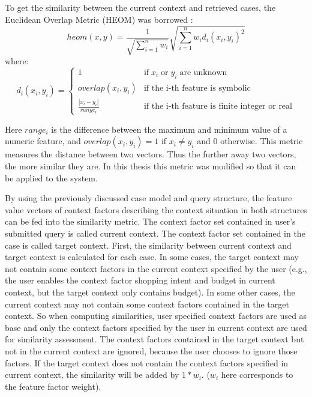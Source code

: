 To get the similarity between the current context and retrieved cases, the Euclidean Overlap Metric (HEOM) was borrowed \cite{ref:26, ref:34}:
\begin{equation} \label{eq:heom}
heom(x,y)=\frac{1}{\sqrt{\sum^n_{i=1}w_i}}\sqrt{\sum^n_{i=1}w_id_i(x_i,y_i)^2}
\end{equation}
where:
\begin{equation}\label{eq:heom_d}
d_i(x_i, y_i)=
\left\{\begin{matrix}
1 & \mbox{if} \; x_i \; \mbox{or} \; y_i \; \mbox{are unknown}\\ 
overlap(x_i,y_i) & \mbox{if the i-th feature is symbolic}\\ 
\frac{|x_i-y_i|}{range_i} & \mbox{if the i-th feature is finite integer or real} 
\end{matrix}\right.
\end{equation}

Here $range_i$ is the difference between the maximum and minimum value of a numeric feature, and $overlap(x_i, y_i)=1$ if $x_i \neq y_i$ and 0 otherwise. This metric measures the distance between two vectors. Thus the further away two vectors, the more similar they are. In this thesis this metric was modified so that it can be applied to the system.

By using the previously discussed case model and query structure, the feature value vectors of context factors describing the context situation in both structures can be fed into the similarity metric. The context factor set contained in user's submitted query is called current context. The context factor set contained in the case is called target context. First, the similarity between current context and target context is calculated for each case. In some cases, the target context may not contain some context factors in the current context specified by the user (e.g., the user enables the context factor shopping intent and budget in current context, but the target context only contains budget). In some other cases, the current context may not contain some context factors contained in the target context. So when computing similarities, user specified context factors are used as base and only the context factors specified by the user in current context are used for similarity assessment. The context factors contained in the target context but not in the current context are ignored, because the user chooses to ignore those factors. If the target context does not contain the context factors specified in current context, the similarity will be added by $1* w_i$. ($w_i$ here corresponds to the feature factor weight).

